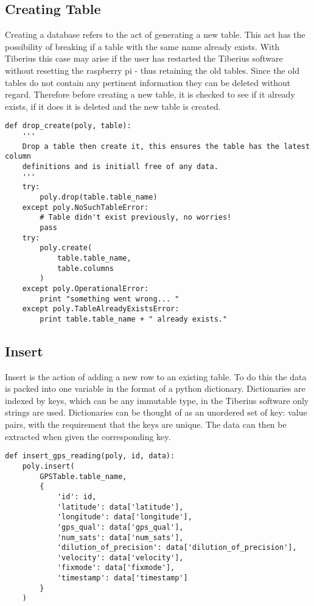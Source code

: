 \subsection{Creating Table}
\label{create}
Creating a database refers to the act of generating a new table. This act has the possibility of breaking if a table with the same name already exists. With Tiberius this case may arise if the user has restarted the Tiberius software without resetting the raspberry pi - thus retaining the old tables. Since the old tables do not contain any pertinent information they can be deleted without regard. Therefore before creating a new table, it is checked to see if it already exists, if it does it is deleted and the new table is created. 

\begin{lstlisting}[style=custompython]
def drop_create(poly, table):
    '''
    Drop a table then create it, this ensures the table has the latest column
    definitions and is initiall free of any data.
    '''
    try:
        poly.drop(table.table_name)
    except poly.NoSuchTableError:
        # Table didn't exist previously, no worries!
        pass
    try:
        poly.create(
            table.table_name,
            table.columns
        )
    except poly.OperationalError:
        print "something went wrong... "
    except poly.TableAlreadyExistsError:
        print table.table_name + " already exists."
\end{lstlisting}


\subsection{Insert}
Insert is the action of adding a new row to an existing table. 
To do this the data is packed into one variable in the format of a python dictionary. Dictionaries are indexed by keys, which can be any immutable type, in the Tiberius software only strings are used. Dictionaries can be thought of as an unordered set of key: value pairs, with the requirement that the keys are unique. The data can then be extracted when given the corresponding key.

\begin{lstlisting}[style=custompython]
def insert_gps_reading(poly, id, data):
    poly.insert(
        GPSTable.table_name,
        {
            'id': id,
            'latitude': data['latitude'],
            'longitude': data['longitude'],
            'gps_qual': data['gps_qual'],
            'num_sats': data['num_sats'],
            'dilution_of_precision': data['dilution_of_precision'],
            'velocity': data['velocity'],
            'fixmode': data['fixmode'],
            'timestamp': data['timestamp']
        }
    )
\end{lstlisting}

